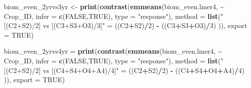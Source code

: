 \documentclass[
]{article}
\newenvironment{Shaded}{\begin{snugshade}}{\end{snugshade}}
\newcommand{\AttributeTok}[1]{\textcolor[rgb]{0.13,0.29,0.53}{#1}}
\newcommand{\ConstantTok}[1]{\textcolor[rgb]{0.56,0.35,0.01}{#1}}
\newcommand{\DecValTok}[1]{\textcolor[rgb]{0.00,0.00,0.81}{#1}}
\newcommand{\FunctionTok}[1]{\textcolor[rgb]{0.13,0.29,0.53}{\textbf{#1}}}
\newcommand{\NormalTok}[1]{#1}
\newcommand{\OtherTok}[1]{\textcolor[rgb]{0.56,0.35,0.01}{#1}}
\newcommand{\SpecialCharTok}[1]{\textcolor[rgb]{0.81,0.36,0.00}{\textbf{#1}}}
\newcommand{\StringTok}[1]{\textcolor[rgb]{0.31,0.60,0.02}{#1}}
\begin{document}
\begin{Shaded}
\begin{Highlighting}[]
\NormalTok{biom\_even\_2yrvs3yr }\OtherTok{\textless{}{-}} \FunctionTok{print}\NormalTok{(}\FunctionTok{contrast}\NormalTok{(}\FunctionTok{emmeans}\NormalTok{(biom\_even.lmer4, }\SpecialCharTok{\textasciitilde{}}\NormalTok{ Crop\_ID,}
                                             \AttributeTok{infer =} \FunctionTok{c}\NormalTok{(}\ConstantTok{FALSE}\NormalTok{,}\ConstantTok{TRUE}\NormalTok{), }
                                             \AttributeTok{type =} \StringTok{"response"}\NormalTok{),}
                                     \AttributeTok{method =} \FunctionTok{list}\NormalTok{(}\StringTok{"[(C2+S2)/2] vs [(C3+S3+O3)/3]"} \OtherTok{=} 
\NormalTok{                                                     ((C2}\SpecialCharTok{+}\NormalTok{S2)}\SpecialCharTok{/}\DecValTok{2}\NormalTok{) }\SpecialCharTok{{-}}\NormalTok{ ((C3}\SpecialCharTok{+}\NormalTok{S3}\SpecialCharTok{+}\NormalTok{O3)}\SpecialCharTok{/}\DecValTok{3}\NormalTok{) )),}
                            \AttributeTok{export =} \ConstantTok{TRUE}\NormalTok{)}


\NormalTok{biom\_even\_2yrvs4yr }\OtherTok{=} \FunctionTok{print}\NormalTok{(}\FunctionTok{contrast}\NormalTok{(}\FunctionTok{emmeans}\NormalTok{(biom\_even.lmer4, }\SpecialCharTok{\textasciitilde{}}\NormalTok{ Crop\_ID,}
                                            \AttributeTok{infer =} \FunctionTok{c}\NormalTok{(}\ConstantTok{FALSE}\NormalTok{,}\ConstantTok{TRUE}\NormalTok{),}
                                            \AttributeTok{type =} \StringTok{"response"}\NormalTok{),}
                                    \AttributeTok{method =} \FunctionTok{list}\NormalTok{(}\StringTok{"[(C2+S2)/2] vs [(C4+S4+O4+A4)/4]"} \OtherTok{=}
\NormalTok{                                                    ((C2}\SpecialCharTok{+}\NormalTok{S2)}\SpecialCharTok{/}\DecValTok{2}\NormalTok{) }\SpecialCharTok{{-}}\NormalTok{ ((C4}\SpecialCharTok{+}\NormalTok{S4}\SpecialCharTok{+}\NormalTok{O4}\SpecialCharTok{+}\NormalTok{A4)}\SpecialCharTok{/}\DecValTok{4}\NormalTok{) )),}
                           \AttributeTok{export =} \ConstantTok{TRUE}\NormalTok{)}



\end{Highlighting}
\end{Shaded}
\end{document}

